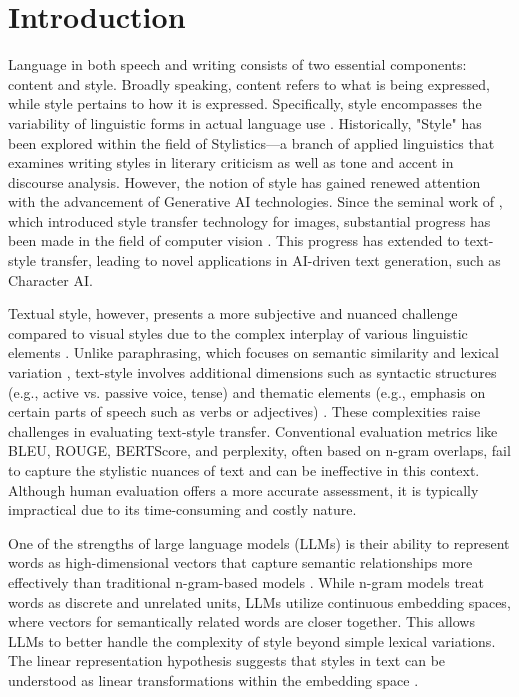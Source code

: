 \section{Introduction}
\label{sec:intro}

Language in both speech and writing consists of two essential components: content and style. Broadly speaking, content refers to what is being expressed, while style pertains to how it is expressed. Specifically, style encompasses the variability of linguistic forms in actual language use \cite{inbook}. Historically, "Style" has been explored within the field of Stylistics—a branch of applied linguistics that examines writing styles in literary criticism as well as tone and accent in discourse analysis. However, the notion of style has gained renewed attention with the advancement of Generative AI technologies. Since the seminal work of \cite{gatys2015neuralalgorithmartisticstyle}, which introduced style transfer technology for images, substantial progress has been made in the field of computer vision \cite{gatys2015neuralalgorithmartisticstyle}. This progress has extended to text-style transfer, leading to novel applications in AI-driven text generation, such as Character AI.

Textual style, however, presents a more subjective and nuanced challenge compared to visual styles due to the complex interplay of various linguistic elements \cite{corpus}. Unlike paraphrasing, which focuses on semantic similarity and lexical variation \cite{shen2022evaluationmetricsparaphrasegeneration}, text-style involves additional dimensions such as syntactic structures (e.g., active vs. passive voice, tense) and thematic elements (e.g., emphasis on certain parts of speech such as verbs or adjectives) \cite{lyu2021styleptbcompositionalbenchmarkfinegrained}. These complexities raise challenges in evaluating text-style transfer. Conventional evaluation metrics like BLEU, ROUGE, BERTScore, and perplexity, often based on n-gram overlaps, fail to capture the stylistic nuances of text and can be ineffective in this context. Although human evaluation offers a more accurate assessment, it is typically impractical due to its time-consuming and costly nature.

One of the strengths of large language models (LLMs) is their ability to represent words as high-dimensional vectors that capture semantic relationships more effectively than traditional n-gram-based models \cite{mikolov-etal-2013-linguistic}. While n-gram models treat words as discrete and unrelated units, LLMs utilize continuous embedding spaces, where vectors for semantically related words are closer together. This allows LLMs to better handle the complexity of style beyond simple lexical variations. The linear representation hypothesis suggests that styles in text can be understood as linear transformations within the embedding space \cite{mikolov2013distributedrepresentationswordsphrases}. 

